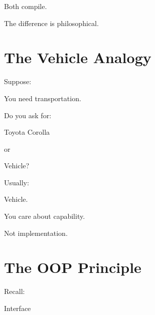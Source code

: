 \documentclass[11pt,a4paper]{book}
\begin{document}

Both compile.


The difference is philosophical.


\section{The Vehicle Analogy}

Suppose:


You need transportation.


Do you ask for:


Toyota Corolla


or


Vehicle?


Usually:


Vehicle.


You care about capability.


Not implementation.


\section{The OOP Principle}

Recall:


Interface
\end{document}
